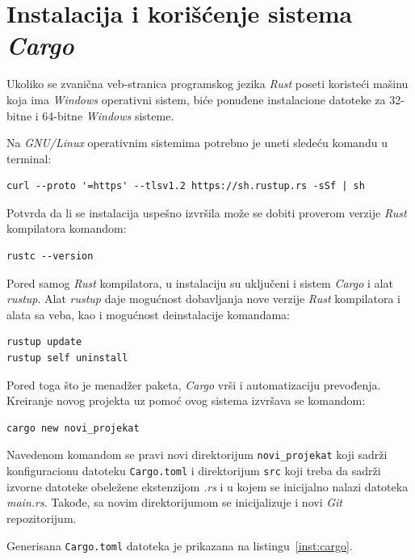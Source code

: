 \documentclass[12pt,oneside]{memoir}
\begin{document}
\section{Instalacija i korišćenje sistema \emph{Cargo}}
Ukoliko se zvanična veb-stranica programskog jezika \emph{Rust} poseti koristeći
mašinu koja ima \emph{Windows} operativni sistem, biće ponuđene
instalacione datoteke za 32-bitne i 64-bitne \emph{Windows} sisteme.

Na \emph{GNU/Linux} operativnim sistemima potrebno je uneti sledeću
komandu u terminal:

\begin{lstlisting}[language={}, style=text]
curl --proto '=https' --tlsv1.2 https://sh.rustup.rs -sSf | sh
\end{lstlisting}

\noindent
Potvrda da li se instalacija uspešno izvršila može se dobiti proverom verzije
\emph{Rust} kompilatora komandom:

\begin{lstlisting}[language={}, style=text]
rustc --version
\end{lstlisting}

Pored samog \emph{Rust} kompilatora, u instalaciju su uključeni i
sistem \emph{Cargo} i alat \emph{rustup}. Alat \emph{rustup} daje mogućnost
dobavljanja nove verzije \emph{Rust} kompilatora i alata sa veba, kao i
mogućnost deinstalacije komandama:

\begin{lstlisting}[language={}, style=text]
rustup update
rustup self uninstall
\end{lstlisting}

Pored toga što je menadžer paketa, \emph{Cargo} vrši i automatizaciju
prevođenja. Kreiranje novog projekta uz pomoć ovog sistema izvršava
se komandom:

\begin{lstlisting}[language={}, style=text]
cargo new novi_projekat
\end{lstlisting}

Navedenom komandom se pravi novi direktorijum \texttt{novi\_projekat} koji
sadrži konfiguracionu datoteku \texttt{Cargo.toml} i direktorijum \texttt{src}
koji treba da sadrži izvorne datoteke obeležene ekstenzijom \emph{.rs}
i u kojem se inicijalno nalazi datoteka \emph{main.rs}. Takođe, sa novim direktorijumom se
inicijalizuje i novi \emph{Git} repozitorijum.

Generisana \texttt{Cargo.toml} datoteka je prikazana na listingu~\ref{inst:cargo}.
\end{document}
